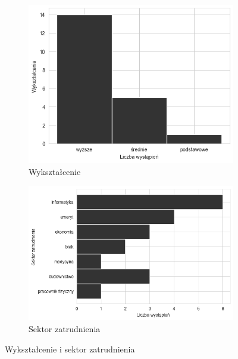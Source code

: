 \documentclass{./assets/wfis}
\begin{document}
\begin{figure}[h!]
\begin{subfigure}[b]{0.4\textwidth}
    \centering
    \includegraphics[width=\columnwidth]{thesis/assets/education.png}
    \caption{Wykształcenie}
    \label{fig:education}
\end{subfigure}   
\hfill
\begin{subfigure}[b]{0.5\textwidth}
    \centering
    \includegraphics[width=\columnwidth]{thesis/assets/jobs.png}
    \caption{Sektor zatrudnienia}
    \label{fig:jobs}
\end{subfigure}
\caption{Wykształcenie i sektor zatrudnienia}
\end{figure}


\end{document}
